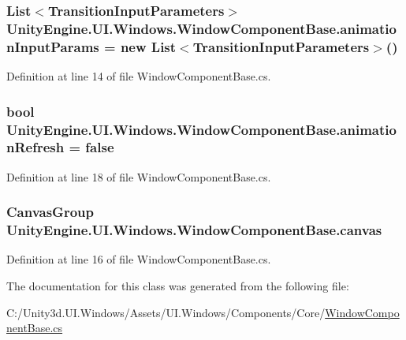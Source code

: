\subsubsection[{animation\+Input\+Params}]{\setlength{\rightskip}{0pt plus 5cm}List$<${\bf Transition\+Input\+Parameters}$>$ Unity\+Engine.\+U\+I.\+Windows.\+Window\+Component\+Base.\+animation\+Input\+Params = new List$<${\bf Transition\+Input\+Parameters}$>$()}\label{class_unity_engine_1_1_u_i_1_1_windows_1_1_window_component_base_a6733fb2bce75f137ede6db940e4a869f}


Definition at line 14 of file Window\+Component\+Base.\+cs.

\hypertarget{class_unity_engine_1_1_u_i_1_1_windows_1_1_window_component_base_a43bdae95cc690dc7fe2284014672ec75}{}
\subsubsection[{animation\+Refresh}]{\setlength{\rightskip}{0pt plus 5cm}bool Unity\+Engine.\+U\+I.\+Windows.\+Window\+Component\+Base.\+animation\+Refresh = false}\label{class_unity_engine_1_1_u_i_1_1_windows_1_1_window_component_base_a43bdae95cc690dc7fe2284014672ec75}


Definition at line 18 of file Window\+Component\+Base.\+cs.

\hypertarget{class_unity_engine_1_1_u_i_1_1_windows_1_1_window_component_base_a686d80d8db9fffa45101f08c04490335}{}
\subsubsection[{canvas}]{\setlength{\rightskip}{0pt plus 5cm}Canvas\+Group Unity\+Engine.\+U\+I.\+Windows.\+Window\+Component\+Base.\+canvas}\label{class_unity_engine_1_1_u_i_1_1_windows_1_1_window_component_base_a686d80d8db9fffa45101f08c04490335}


Definition at line 16 of file Window\+Component\+Base.\+cs.



The documentation for this class was generated from the following file\+:\begin{DoxyCompactItemize}
\item 
C\+:/\+Unity3d.\+U\+I.\+Windows/\+Assets/\+U\+I.\+Windows/\+Components/\+Core/\hyperlink{_window_component_base_8cs}{Window\+Component\+Base.\+cs}\end{DoxyCompactItemize}
